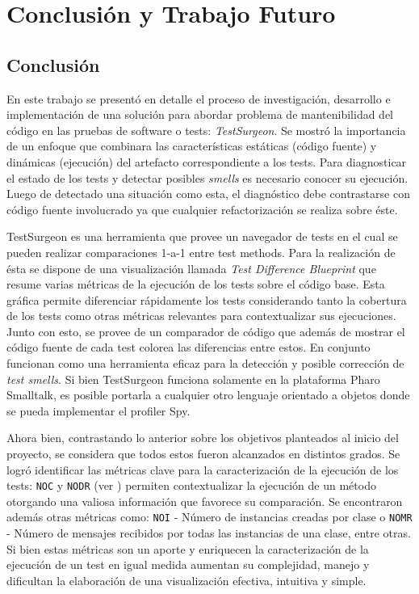 \chapter{Conclusión y Trabajo Futuro}

\section{Conclusión}

\par En este trabajo se presentó en detalle el proceso de investigación, desarrollo e implementación de una solución para abordar problema de mantenibilidad del código en las pruebas de software o tests: \emph{TestSurgeon}. Se mostró la importancia de un enfoque que combinara las características estáticas (código fuente) y dinámicas (ejecución) del artefacto correspondiente a los tests. Para diagnosticar el estado de los tests y detectar posibles \emph{smells} es necesario conocer su ejecución. Luego de detectado una situación como esta, el diagnóstico debe contrastarse con código fuente involucrado ya que cualquier refactorización se realiza sobre éste.

\par TestSurgeon es una herramienta que provee un navegador de tests en el cual se pueden realizar comparaciones 1-a-1 entre test methods. Para la realización de ésta se dispone de una visualización llamada \emph{Test Difference Blueprint} que resume varias métricas de la ejecución de los tests sobre el código base. Esta gráfica permite diferenciar rápidamente los tests considerando tanto la cobertura de los tests como otras métricas relevantes para contextualizar sus ejecuciones. Junto con esto, se provee de un comparador de código que además de mostrar el código fuente de cada test colorea las diferencias entre estos. En conjunto funcionan como una herramienta eficaz para la detección y posible corrección de \emph{test smells}. Si bien TestSurgeon funciona solamente en la plataforma Pharo Smalltalk, es posible portarla a cualquier otro lenguaje orientado a objetos donde se pueda implementar el profiler Spy.


\par Ahora bien, contrastando lo anterior sobre los objetivos planteados al inicio del proyecto, se considera que todos estos fueron alcanzados en distintos grados. Se logró identificar las métricas clave para la caracterización de la ejecución de los tests: {\tt NOC} y {\tt NODR} (ver ) permiten contextualizar la ejecución de un método otorgando una valiosa información que favorece su comparación. Se encontraron además otras métricas como: {\tt NOI} - Número de instancias creadas por clase o {\tt NOMR} - Número de mensajes recibidos por todas las instancias de una clase, entre otras. Si bien estas métricas son un aporte y enriquecen la caracterización de la ejecución de un test en igual medida aumentan su complejidad, manejo y dificultan la elaboración de una visualización efectiva, intuitiva y simple. 

